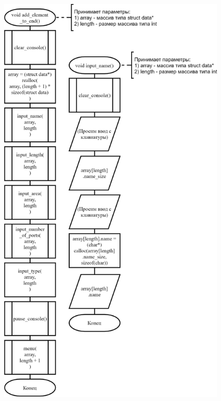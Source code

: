 \begin{figure}[!htp]
    \includegraphics{../../Makefile-project/src/menu/add_element_end/add_element_end-1.png}
\end{figure}

